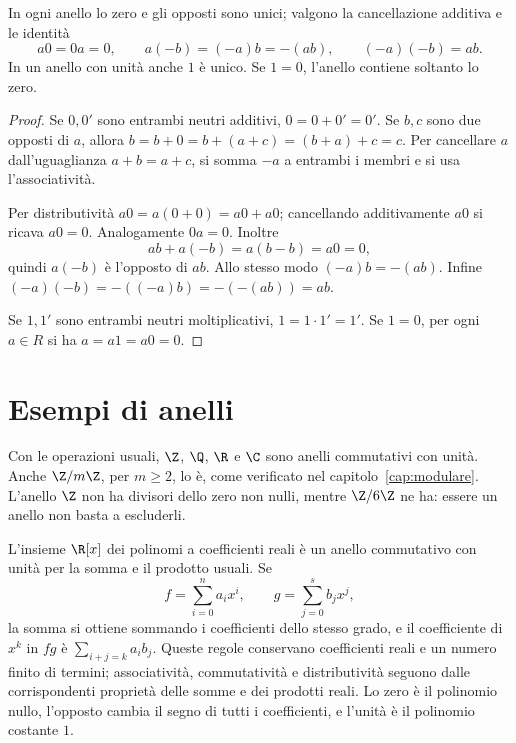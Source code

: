 \begin{proposizione}\label{prop:prime-anello}
In ogni anello lo zero e gli opposti sono unici; valgono la cancellazione additiva e le identità
\[
a0=0a=0,\qquad a(-b)=(-a)b=-(ab),\qquad(-a)(-b)=ab.
\]
In un anello con unità anche $1$ è unico. Se $1=0$, l'anello contiene soltanto lo zero.
\end{proposizione}
\begin{proof}
Se $0,0'$ sono entrambi neutri additivi, $0=0+0'=0'$. Se $b,c$ sono due opposti di $a$, allora $b=b+0=b+(a+c)=(b+a)+c=c$. Per cancellare $a$ dall'uguaglianza $a+b=a+c$, si somma $-a$ a entrambi i membri e si usa l'associatività.

Per distributività $a0=a(0+0)=a0+a0$; cancellando additivamente $a0$ si ricava $a0=0$. Analogamente $0a=0$. Inoltre
\[
ab+a(-b)=a(b-b)=a0=0,
\]
quindi $a(-b)$ è l'opposto di $ab$. Allo stesso modo $(-a)b=-(ab)$. Infine $(-a)(-b)=-((-a)b)=-(-(ab))=ab$.

Se $1,1'$ sono entrambi neutri moltiplicativi, $1=1\cdot1'=1'$. Se $1=0$, per ogni $a\in R$ si ha $a=a1=a0=0$.
\end{proof}

\section{Esempi di anelli}
\begin{esempio}
Con le operazioni usuali, $\Z$, $\Q$, $\R$ e $\C$ sono anelli commutativi con unità. Anche $\Z/m\Z$, per $m\ge2$, lo è, come verificato nel capitolo~\ref{cap:modulare}. L'anello $\Z$ non ha divisori dello zero non nulli, mentre $\Z/6\Z$ ne ha: essere un anello non basta a escluderli.
\end{esempio}

\begin{esempio}
L'insieme $\R[x]$ dei polinomi a coefficienti reali è un anello commutativo con unità per la somma e il prodotto usuali. Se
\[
f=\sum_{i=0}^n a_ix^i,\qquad g=\sum_{j=0}^s b_jx^j,
\]
la somma si ottiene sommando i coefficienti dello stesso grado, e il coefficiente di $x^k$ in $fg$ è $\sum_{i+j=k}a_ib_j$. Queste regole conservano coefficienti reali e un numero finito di termini; associatività, commutatività e distributività seguono dalle corrispondenti proprietà delle somme e dei prodotti reali. Lo zero è il polinomio nullo, l'opposto cambia il segno di tutti i coefficienti, e l'unità è il polinomio costante $1$.
\end{esempio}

